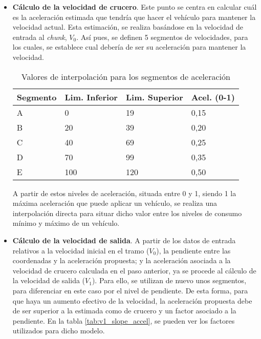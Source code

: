 \documentclass[11pt,spanish,listoffigures,listoftables]{tfgetsinf}
\begin{document}
\begin{itemize}
    \item \textbf{Cálculo de la velocidad de crucero}. Este punto se centra en calcular cuál es la aceleración estimada que tendría que hacer el vehículo para mantener la velocidad actual. Esta estimación, se realiza basándose en la velocidad de entrada al \textit{chunk}, $V_{0}$. Así pues, se definen 5 segmentos de velocidades, para los cuales, se establece cual debería de ser su aceleración para mantener la velocidad.
    \begin{table}[h]
    \centering
    \begin{tabular}{|l|l|l|l|}
    \hline
    \textbf{Segmento} & \textbf{Lim. Inferior} & \textbf{Lim. Superior} & \textbf{Acel. (0-1)} \\ \hline
    A        & 0             & 19            & 0,15         \\ \hline
    B        & 20            & 39            & 0,20         \\ \hline
    C        & 40            & 69            & 0,25         \\ \hline
    D        & 70            & 99            & 0,35         \\ \hline
    E        & 100           & 120           & 0,50         \\ \hline
    \end{tabular}
    \caption{Valores de interpolación para los segmentos de aceleración}
    \label{tab:v1_accel_interp}
    \end{table}
    
    A partir de estos niveles de aceleración, situada entre 0 y 1, siendo 1 la máxima aceleración que puede aplicar un vehículo, se realiza una interpolación directa para situar dicho valor entre los niveles de consumo mínimo y máximo de un vehículo.
    
    \item \textbf{Cálculo de la velocidad de salida}. A partir de los datos de entrada relativos a la velocidad inicial en el tramo ($V_{0}$), la pendiente entre las coordenadas y la aceleración propuesta; y la aceleración asociada a la velocidad de crucero calculada en el paso anterior, ya se procede al cálculo de la velocidad de salida ($V_{1}$). Para ello, se utilizan de nuevo unos segmentos, para diferenciar en este caso por el nivel de pendiente. De esta forma, para que haya un aumento efectivo de la velocidad, la aceleración propuesta debe de ser superior a la estimada como de crucero y un factor asociado a la pendiente. En la tabla \ref{tab:v1_slope_accel}, se pueden ver los factores utilizados para dicho modelo.
    

\end{itemize}
\end{document}
